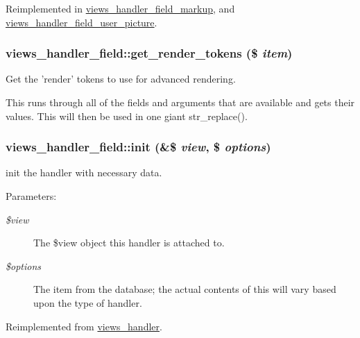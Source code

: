 Reimplemented in \hyperlink{classviews__handler__field__markup_0de6d7c5e99dfd22ce7e7a4662af8082}{views\_\-handler\_\-field\_\-markup}, and \hyperlink{classviews__handler__field__user__picture_a489de4d3a5f1d5656bad62545ee81ec}{views\_\-handler\_\-field\_\-user\_\-picture}.\hypertarget{classviews__handler__field_09c76b4e29ba8b0e6694ba4e341ef609}{
\subsubsection[{get\_\-render\_\-tokens}]{\setlength{\rightskip}{0pt plus 5cm}views\_\-handler\_\-field::get\_\-render\_\-tokens (\$ {\em item})}}
\label{classviews__handler__field_09c76b4e29ba8b0e6694ba4e341ef609}


Get the 'render' tokens to use for advanced rendering.

This runs through all of the fields and arguments that are available and gets their values. This will then be used in one giant str\_\-replace(). \hypertarget{classviews__handler__field_7eaaf0fd6fbc57c2955f88b257394d19}{
\subsubsection[{init}]{\setlength{\rightskip}{0pt plus 5cm}views\_\-handler\_\-field::init (\&\$ {\em view}, \/  \$ {\em options})}}
\label{classviews__handler__field_7eaaf0fd6fbc57c2955f88b257394d19}


init the handler with necessary data. \begin{Desc}
\item[Parameters:]
\begin{description}
\item[{\em \$view}]The \$view object this handler is attached to. \item[{\em \$options}]The item from the database; the actual contents of this will vary based upon the type of handler. \end{description}
\end{Desc}


Reimplemented from \hyperlink{classviews__handler_1f5f42ba46d3584280788fda97eee8c5}{views\_\-handler}.

